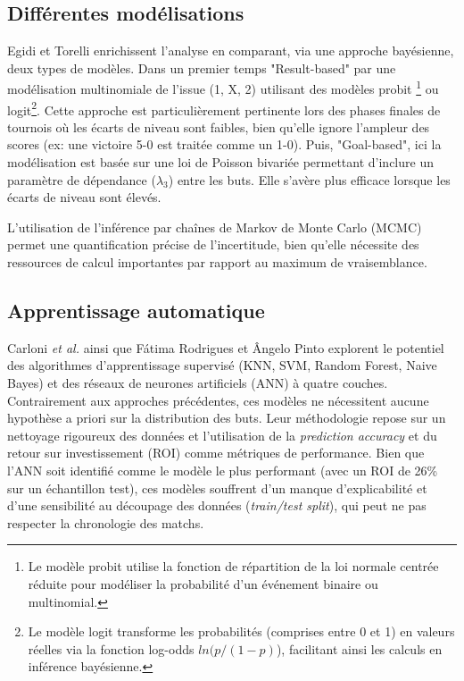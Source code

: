 
\subsection{Différentes modélisations}

Egidi et Torelli \cite{egidi} enrichissent l'analyse en comparant, via une 
approche bayésienne, deux types de modèles. Dans un premier temps "Result-based" par 
une modélisation multinomiale de l'issue (1, X, 2) utilisant des modèles probit
\footnote{Le modèle probit utilise la fonction de répartition de la loi normale 
centrée réduite pour modéliser la probabilité d'un événement binaire ou multinomial.} 
ou logit\footnote{Le modèle logit transforme les probabilités (comprises entre 0 et 1) 
en valeurs réelles via la fonction log-odds $ln(p/(1-p)$), facilitant ainsi les calculs 
en inférence bayésienne.}. 
Cette approche est particulièrement pertinente lors des phases finales de tournois où 
les écarts de niveau sont faibles, bien qu'elle ignore l'ampleur des scores 
(ex: une victoire 5-0 est traitée comme un 1-0). Puis, "Goal-based", ici la modélisation 
est basée sur une loi de Poisson bivariée permettant d'inclure un paramètre de 
dépendance ($\lambda_3$) entre les buts. Elle s'avère plus efficace lorsque 
les écarts de niveau sont élevés.


\noindent L'utilisation de l'inférence par chaînes de Markov de Monte Carlo (MCMC) permet 
une quantification précise de l'incertitude, bien qu'elle nécessite des ressources 
de calcul importantes par rapport au maximum de vraisemblance.

\subsection{Apprentissage automatique}

Carloni \textit{et al.} \cite{carloni} ainsi que Fátima Rodrigues et Ângelo Pinto \cite{rodrigues} explorent le potentiel des algorithmes 
d'apprentissage supervisé (KNN, SVM, Random Forest, Naive Bayes) et des réseaux 
de neurones artificiels (ANN) à quatre couches. Contrairement aux approches 
précédentes, ces modèles ne nécessitent aucune hypothèse a priori sur la 
distribution des buts. 
Leur méthodologie repose sur un nettoyage rigoureux des données et l'utilisation de la \textit{prediction accuracy} et du 
retour sur investissement (ROI) comme métriques de performance. Bien que l'ANN 
soit identifié comme le modèle le plus performant (avec un ROI de 26\% sur un 
échantillon test), ces modèles souffrent d'un manque d'explicabilité et d'une 
sensibilité au découpage des données (\textit{train/test split}), qui peut ne 
pas respecter la chronologie des matchs.
